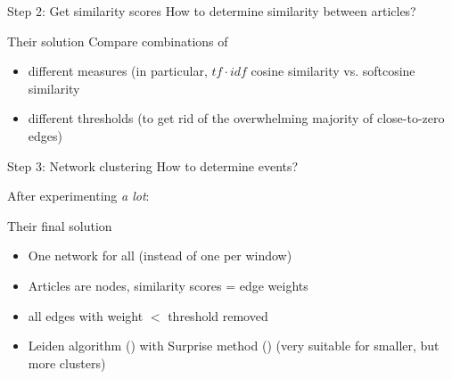 \begin{frame}{Step 2: Get similarity scores}
  How to determine similarity between articles?
  \begin{block}{Their solution}
  Compare combinations of 
  \begin{itemize}
  \item different measures (in particular, $tf\cdot idf$ cosine similarity vs. softcosine similarity
  \item different thresholds (to get rid of the overwhelming majority of close-to-zero edges) 
  \end{itemize}
\end{block}
\end{frame}


\begin{frame}{Step 3: Network clustering}
  How to determine events?

  After experimenting \emph{a lot}:
	
  \begin{block}{Their final solution}
    \begin{itemize}
    \item One network for all (instead of one per window)
    \item Articles are nodes, similarity scores = edge weights
    \item all edges with weight $<$ threshold removed
    \item Leiden algorithm (\cite{Traag2019}) with Surprise method (\cite{Traag2015}) (very suitable for smaller, but more clusters)
    \end{itemize}
  \end{block}
  
\end{frame}



